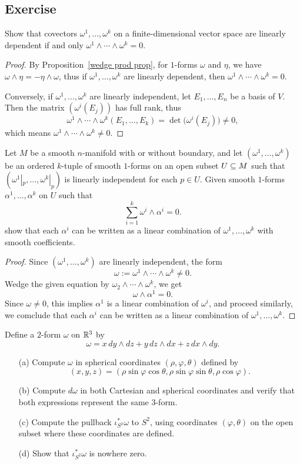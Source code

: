 \subsection{Exercise}
\begin{exercise}
Show that covectors $\omega^1,\dots,\omega^k$ on a finite-dimensional vector space are
linearly dependent if and only $\omega^1\wedge\cdots\wedge\omega^k=0$.
\end{exercise}
\begin{proof}
By Proposition~\ref{wedge prod prop}, for $1$-forms $\omega$ and $\eta$, we have $\omega\wedge\eta=-\eta\wedge\omega$, thus if $\omega^1,\dots,\omega^k$ are
linearly dependent, then $\omega^1\wedge\cdots\wedge\omega^k=0$.\par
Conversely, if $\omega^1,\dots,\omega^k$ are linearly independent, let $E_1,\dots,E_n$ be a basis of $V$. Then the matrix $(\omega^i(E_j))$ has full rank, thus 
\[\omega^1\wedge\cdots\wedge\omega^k(E_1,\dots,E_k)=\det\big(\omega^i(E_j)\big)\neq 0,\]
which means $\omega^1\wedge\cdots\wedge\omega^k\neq0$.
\end{proof}
\begin{exercise}
Let $M$ be a smooth $n$-manifold with or without boundary, and let $(\omega^1,\dots,\omega^k)$ be an ordered $k$-tuple of smooth $1$-forms on an open subset $U\subseteq M$ such that $(\omega^1|_p,\dots,\omega^k|_p)$ is linearly independent for each $p\in U$. Given smooth $1$-forms $\alpha^1,\dots,\alpha^k$ on $U$ such that
\[\sum_{i=1}^{k}\omega^i\wedge\alpha^i=0.\]
show that each $\alpha^i$ can be written as a linear combination of $\omega^1,\dots,\omega^k$ with smooth coefficients.
\end{exercise}
\begin{proof}
Since $(\omega^1,\dots,\omega^k)$ are linearly independent, the form
\[\omega:=\omega^1\wedge\cdots\wedge \omega^k\neq 0.\]
Wedge the given equation by $\omega_2\wedge\cdots\wedge\omega^k$, we get
\[\omega\wedge\alpha^1=0.\]
Since $\omega\neq 0$, this implies $\alpha^1$ is a linear combination of $\omega^i$, and proceed similarly, we comclude that each $\alpha^i$ can be written as a linear combination of $\omega^1,\dots,\omega^k$.
\end{proof}
\begin{exercise}
Define a $2$-form $\omega$ on $\mathbb{R}^3$ by
\[\omega=x\,dy\wedge dz+y\,dz\wedge dx+z\,dx\wedge dy.\]
\begin{itemize}
\item[(a)] Compute $\omega$ in spherical coordinates $(\rho,\varphi,\theta)$ defined by
\[(x,y,z)=(\rho\sin\varphi\cos\theta,\rho\sin\varphi\sin\theta,\rho\cos\varphi).\]
\item[(b)] Compute $d\omega$ in both Cartesian and spherical coordinates and verify that both expressions represent the same $3$-form.
\item[(c)] Compute the pullback $\iota^*_{S^2}\omega$ to $S^2$, using coordinates $(\varphi,\theta)$ on the open subset where these coordinates are defined.
\item[(d)] Show that $\iota^*_{S^2}\omega$ is nowhere zero.
\end{itemize}
\end{exercise}
